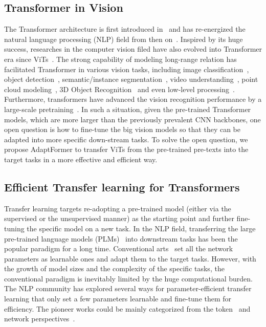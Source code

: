 \subsection{Transformer in Vision} The Transformer architecture is first introduced in~\cite{vaswani-nips17-transformer} and has re-energized the natural language processing (NLP) field from then on~\cite{devlin-2018-bert,brown-nips20-gpt}. Inspired by its huge success, researches in the computer vision filed have also evolved into Transformer era since ViTs~\cite{dosovitskiy-2020-vit}. The strong capability of modeling long-range relation has facilitated Transformer in various vision tasks, including image classification~\cite{dosovitskiy-2020-vit,liu-iccv21-swin,liang-iclr22-not}, object detection~\cite{carion-eccv20-detr,zhu-2020-deformabledetr,chi-nips20-relationnet++}, semantic/instance segmentation~\cite{xie-nips21-segformer}, video understanding~\cite{bertasius-2021-timesformer, arnab2021vivit, fan-iccv21-mvit, li2022uniformer}, point cloud modeling~\cite{zhao2021point, guo-2021-pct}, 3D Object Recognition~\cite{ chen-2021-mvt} and even low-level processing~\cite{chen-cvpr21-pre,liang-iccv21-swinir,wang-2021-uformer}. Furthermore, transformers have advanced the vision recognition performance by a large-scale pretraining~\cite{chen-iccv21-mocov3,pan-cvpr21-videomoco,caron-iccv21-dino,ge-nips21-care,he-2021-mae,tong-2022-videomae,radford-icml21-clip}. In such a situation, given the pre-trained Transformer models, which are more larger than the previously prevalent CNN backbones, one open question is how to fine-tune the big vision models so that they can be adapted into more specific down-stream tasks. To solve the open question, we propose AdaptFormer to transfer ViTs from the pre-trained pre-texts into the target tasks in a more effective and efficient way.

\subsection{Efficient Transfer learning for Transformers} Transfer learning targets re-adopting a pre-trained model (either via the supervised or the unsupervised manner) as the starting point and further fine-tuning the specific model on a new task. In the NLP field, transferring the large pre-trained language models (PLMs)~\cite{devlin-2018-bert,brown-nips20-gpt} into downstream tasks has been the popular paradigm for a long time. Conventional arts~\cite{devlin-2018-bert,brown-nips20-gpt} set all the network parameters as learnable ones and adapt them to the target tasks. However, with the growth of model sizes and the complexity of the specific tasks, the conventional paradigm is inevitably limited by the huge computational burden. The NLP community has explored several ways for parameter-efficient transfer learning that only set a few parameters learnable and fine-tune them for efficiency. The pioneer works could be mainly categorized from the token~\cite{li-2021-prefix,lester-2021-nlpprompt} and network perspectives~\cite{houlsby-2019-adapternlp,hu-2021-lora,zaken-2021-bitfit,guo-2020-diff}. 

